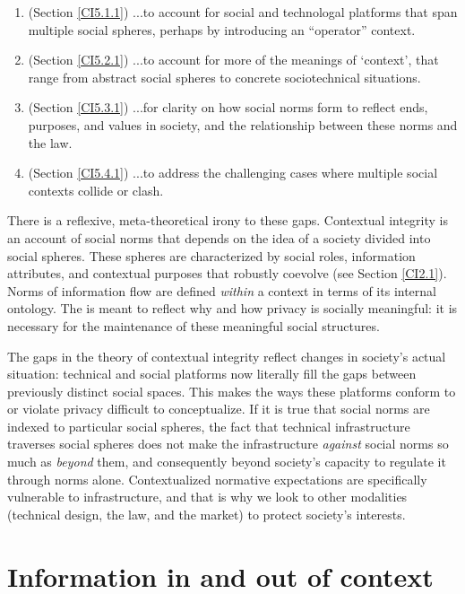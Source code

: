 \documentclass[../thesis.tex]{subfiles}
\begin{document}
 \begin{enumerate}
 \item (Section \ref{CI5.1.1}) ...to account for
   social and technologal platforms that span multiple
   social spheres, perhaps by introducing an ``operator'' context.
 \item (Section \ref{CI5.2.1}) ...to account for more of the meanings of `context',
   that range from abstract social spheres to concrete
   sociotechnical situations.
 \item (Section \ref{CI5.3.1}) ...for clarity on how
   social norms form to reflect ends, purposes, and values in
   society, and the relationship between these norms and the law.
 \item (Section \ref{CI5.4.1}) ...to address the challenging cases where multiple social contexts collide or clash.
 \end{enumerate}

 There is a reflexive, meta-theoretical irony to these gaps.
 Contextual integrity is an account of social norms that
 depends on the idea of a society divided into social spheres.
 These spheres are characterized by social roles,
 information attributes, and contextual purposes that robustly
 coevolve (see Section \ref{CI2.1}).
 Norms of information flow are defined \textit{within} a context
 in terms of its internal ontology.
 The is meant to reflect why and how privacy is socially meaningful:
 it is necessary for the maintenance of these meaningful social structures.

 The gaps in the theory of contextual integrity reflect changes in society's actual situation: technical and social platforms now literally fill the gaps between previously distinct social spaces.
 This makes the ways these platforms conform to or violate privacy
 difficult to conceptualize.
 If it is true that social norms are indexed to particular social
 spheres, the fact that technical infrastructure traverses social spheres does not make the infrastructure \textit{against} social norms so much as \textit{beyond} them, and consequently beyond society's
 capacity to regulate it through norms alone.
 Contextualized normative expectations are specifically vulnerable
 to infrastructure, and that is why we look
 to other modalities (technical design, the law, and the market)
 to protect society's interests.

 \section{Information in and out of context}
\end{document}
